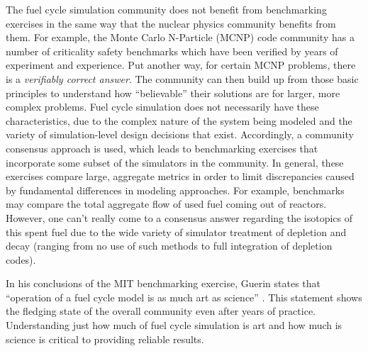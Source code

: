 The fuel cycle simulation community does not benefit from benchmarking exercises
in the same way that the nuclear physics community benefits from them. For
example, the Monte Carlo N-Particle (MCNP) code community has a number of
criticality safety benchmarks \cite{wagner_mcnp:_1992} which have been verified
by years of experiment and experience. Put another way, for certain MCNP
problems, there is a \textit{verifiably correct answer}. The community can then
build up from those basic principles to understand how ``believable'' their
solutions are for larger, more complex problems. Fuel cycle simulation does not
necessarily have these characteristics, due to the complex nature of the system
being modeled and the variety of simulation-level design decisions that
exist. Accordingly, a community consensus approach is used, which leads to
benchmarking exercises that incorporate some subset of the simulators in the
community. In general, these exercises compare large, aggregate metrics in order
to limit discrepancies caused by fundamental differences in modeling
approaches. For example, benchmarks may compare the total aggregate flow of used
fuel coming out of reactors. However, one can't really come to a consensus
answer regarding the isotopics of this spent fuel due to the wide variety of
simulator treatment of depletion and decay (ranging from no use of such methods
to full integration of depletion codes).

In his conclusions of the MIT benchmarking exercise, Guerin states that
``operation of a fuel cycle model is as much art as science''
\cite{guerin_benchmark_2009}. This statement shows the fledging state of the
overall community even after years of practice. Understanding just how much of
fuel cycle simulation is art and how much is science is critical to providing
reliable results.
